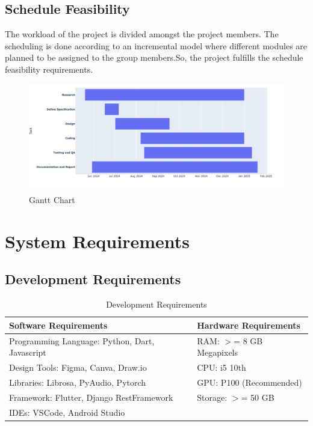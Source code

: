 \subsection{Schedule Feasibility}
The workload of the project is divided amongst the project members. The
scheduling is done according to an incremental model where different modules
are planned to be assigned to the group members.So, the project fulfills the
schedule feasibility requirements.
\begin{figure}[h]
    \centering
    \includegraphics[scale=0.4]{images/GanttChart.png}
    \caption{Gantt Chart}\label{fig:my_label}
\end{figure}
\newpage
\section{System Requirements}

\subsection{Development Requirements}
\begin{table}[h]
    \centering
    \caption{Development Requirements}
    \begin{tabular}{|l|l|}
        \hline
        \textbf{Software Requirements}                 & \textbf{Hardware
        Requirements}                                                          \\ \hline
        Programming Language: Python, Dart, Javascript & RAM: \(>\)= 8 GB
        Megapixels                                                             \\ \hline
        Design Tools: Figma, Canva, Draw.io            & CPU: i5 10th
        \\ \hline
        Libraries: Librosa, PyAudio, Pytorch           & GPU: P100
        (Recommended)                                                          \\ \hline
        Framework: Flutter, Django RestFramework       & Storage: \(>\)= 50 GB
        \\ \hline
        IDEs: VSCode, Android Studio                   &
        \\ \hline
    \end{tabular}
\end{table}


